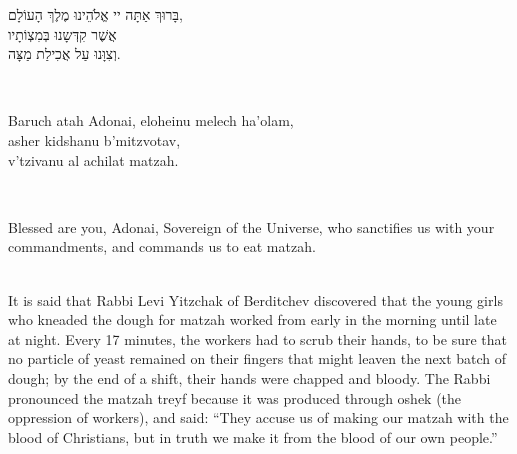 \documentclass[extrafontsizes,twoside,17pt,a4paper,openany]{memoir}
\newcommand{\ch}{ch}
\newenvironment{HgHebrew}{\begin{hebrew}\noindent\large}{\end{hebrew}}
\newenvironment{HgEnglish}{\strut\\\noindent}{\vspace{1em}}
\newenvironment{HgTranslit}{\strut\\\noindent\begin{itshape}}{\end{itshape}\vspace{1em}}
\begin{document}
\begin{raggedleft}
\begin{HgHebrew}
  בָּרוּךְ אַתָּה יי אֱלֹהֵינוּ מֶלֶךְ הָעוֹלָם,
  \\
  אֲשֶׁר קִדְּשָנוּ בְּמִצְוֹתָיו
  \phantom{וְצִוָּנוּ עַל אֲכִילַת מַצָּה.}
  \\
  וְצִוָּנוּ עַל אֲכִילַת מַצָּה.
\end{HgHebrew}
\end{raggedleft}
\begin{multicols}{2}\raggedright
\begin{HgTranslit}\raggedright
  Baru{\ch} atah Adonai, eloheinu mele{\ch} ha'olam, \\
  asher kidshanu b'mitzvotav, \\
  v'tzivanu al a{\ch}ilat matzah.\\
 \phantom{extra line}
\end{HgTranslit}
\columnbreak
\begin{HgEnglish}\raggedright
  Blessed are you, Adonai, Sovereign of the Universe, 
  who sanctifies us with your commandments, 
  and commands us to eat matzah.
\end{HgEnglish}
\end{multicols}
\newpage

\begin{HgEnglish}
  It is said that Rabbi Levi Yitz{\ch}ak of Berditchev discovered that the young
  girls who kneaded the dough for matzah worked from early in the morning until
  late at night. Every 17 minutes, the workers had to scrub their hands, to be
  sure that no particle of yeast remained on their fingers that might leaven the
  next batch of dough; by the end of a shift, their hands were chapped and
  bloody.  The Rabbi pronounced the matzah treyf because it was produced through
  oshek (the oppression of workers), and said: ``They accuse us of making our
  matzah with the blood of Christians, but in truth we make it from the blood of
  our own people.'' 
\end{HgEnglish}

\end{document}
